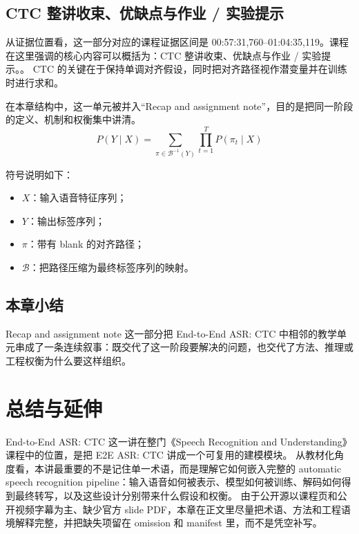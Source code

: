 \documentclass[a4paper]{article}
\begin{document}
\subsection{CTC 整讲收束、优缺点与作业 / 实验提示}
从证据位置看，这一部分对应的课程证据区间是 00:57:31,760--01:04:35,119。课程在这里强调的核心内容可以概括为：CTC 整讲收束、优缺点与作业 / 实验提示。。
CTC 的关键在于保持单调对齐假设，同时把对齐路径视作潜变量并在训练时进行求和。

在本章结构中，这一单元被并入“Recap and assignment note”，目的是把同一阶段的定义、机制和权衡集中讲清。
\[
P(Y \mid X) = \sum_{\pi \in \mathcal{B}^{-1}(Y)} \prod_{t=1}^{T} P(\pi_t \mid X)
\]

符号说明如下：
\begin{itemize}
\item $X$：输入语音特征序列；
\item $Y$：输出标签序列；
\item $\pi$：带有 blank 的对齐路径；
\item $\mathcal{B}$：把路径压缩为最终标签序列的映射。
\end{itemize}

\subsection{本章小结}
Recap and assignment note 这一部分把 End-to-End ASR: CTC 中相邻的教学单元串成了一条连续叙事：既交代了这一阶段要解决的问题，也交代了方法、推理或工程权衡为什么要这样组织。

\section{总结与延伸}
End-to-End ASR: CTC 这一讲在整门《Speech Recognition and Understanding》课程中的位置，是把 E2E ASR: CTC 讲成一个可复用的建模模块。
从教材化角度看，本讲最重要的不是记住单一术语，而是理解它如何嵌入完整的 automatic speech recognition pipeline：输入语音如何被表示、模型如何被训练、解码如何得到最终转写，以及这些设计分别带来什么假设和权衡。
由于公开源以课程页和公开视频字幕为主、缺少官方 slide PDF，本章在正文里尽量把术语、方法和工程语境解释完整，并把缺失项留在 omission 和 manifest 里，而不是凭空补写。
\end{document}
